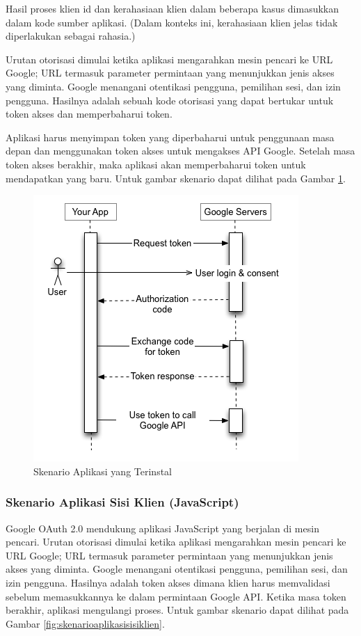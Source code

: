 Hasil proses klien id dan kerahasiaan klien dalam beberapa kasus dimasukkan
dalam kode sumber aplikasi. (Dalam konteks ini, kerahasiaan klien jelas tidak
diperlakukan sebagai rahasia.)

Urutan otorisasi dimulai ketika aplikasi mengarahkan mesin pencari ke URL
Google; URL termasuk parameter permintaan yang menunjukkan jenis akses yang
diminta. Google menangani otentikasi pengguna, pemilihan sesi, dan izin
pengguna. Hasilnya adalah sebuah kode otorisasi yang dapat bertukar untuk token
akses dan memperbaharui token.

Aplikasi harus menyimpan token yang diperbaharui untuk penggunaan masa depan dan
menggunakan token akses untuk mengakses API Google. Setelah masa token akses
berakhir, maka aplikasi akan memperbaharui token untuk mendapatkan yang baru.
Untuk gambar skenario dapat dilihat pada Gambar \ref{fig:skenarioaplikasiyangterinstal}.

\begin{figure}[H]
\centering
\includegraphics[scale=0.8]{Gambar/skenario1.png}
\caption[Skenario Aplikasi yang Terinstal]{Skenario Aplikasi yang Terinstal} 
\label{fig:skenarioaplikasiyangterinstal}
\end{figure}

\subsubsection{Skenario Aplikasi Sisi Klien (JavaScript)}
Google OAuth 2.0 mendukung aplikasi JavaScript yang berjalan di mesin pencari.
Urutan otorisasi dimulai ketika aplikasi mengarahkan mesin pencari ke URL
Google; URL termasuk parameter permintaan yang menunjukkan jenis akses yang
diminta. Google menangani otentikasi pengguna, pemilihan sesi, dan izin
pengguna. Hasilnya adalah token akses dimana klien harus memvalidasi sebelum
memasukkannya ke dalam permintaan Google API. Ketika masa token berakhir,
aplikasi mengulangi proses. Untuk gambar skenario dapat dilihat pada Gambar
\ref{fig:skenarioaplikasisisiklien}.

